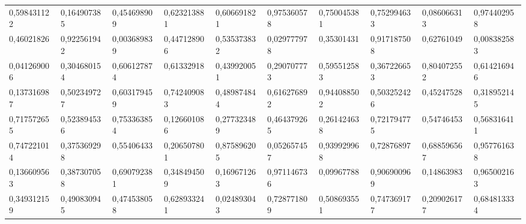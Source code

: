 \documentclass[12pt,ngerman,parskip=half]{scrartcl}
\begin{document}
\begin{table}
\begin{center}
\begin{tabular}{llllllllll}
0,598431122	&	0,164907385	&	0,454698909	&	0,623213881	&	0,606691821	&	0,975360578	&	0,750045381	&	0,752994633	&	0,086066313	&	0,974402958	\\
0,46021826	&	0,922561942	&	0,003689839	&	0,447128906	&	0,535373832	&	0,029777978	&	0,35301431	&	0,917187508	&	0,62761049	&	0,008382583	\\
0,041269006	&	0,304680154	&	0,606127874	&	0,61332918	&	0,439920051	&	0,290707773	&	0,595512583	&	0,367226653	&	0,804072552	&	0,614216946	\\
0,137316987	&	0,502349727	&	0,603179459	&	0,742409083	&	0,489874844	&	0,616276892	&	0,944088502	&	0,503252426	&	0,45247528	&	0,318952145	\\
0,717572655	&	0,523894536	&	0,753363854	&	0,126601086	&	0,277323489	&	0,464379265	&	0,261424638	&	0,721794775	&	0,54746453	&	0,568316411	\\
0,747221014	&	0,375369298	&	0,55406433	&	0,206507801	&	0,875896205	&	0,052657457	&	0,939929968	&	0,72876897	&	0,688596567	&	0,957761638	\\
0,136609563	&	0,387307058	&	0,690792381	&	0,348494509	&	0,169671263	&	0,971146736	&	0,09967788	&	0,906900969	&	0,14863983	&	0,965002163	\\
0,349312159	&	0,490830945	&	0,474538058	&	0,628933241	&	0,024893043	&	0,728771809	&	0,508693551	&	0,747369177	&	0,209026177	&	0,684813334	\\ \bottomrule 
\end{tabular} 
\end{center}
\end{table}
\end{document}
